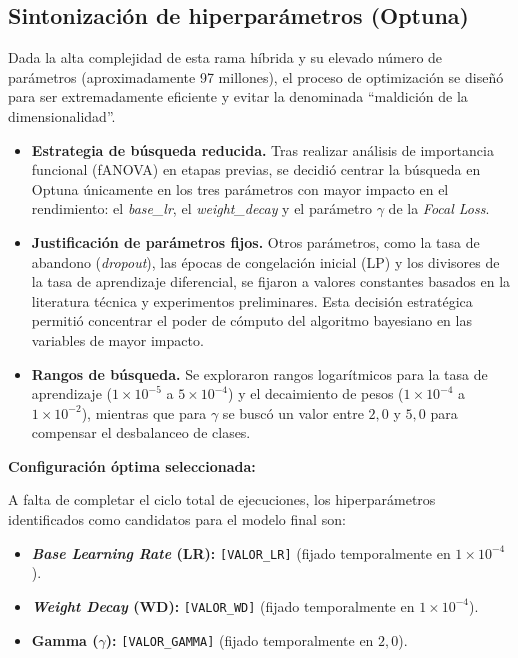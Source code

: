 \subsection{Sintonización de hiperparámetros (Optuna)}

Dada la alta complejidad de esta rama híbrida y su elevado número de parámetros (aproximadamente 97 millones), el proceso de optimización se diseñó para ser extremadamente eficiente y evitar la denominada ``maldición de la dimensionalidad''.

\begin{itemize}
	\item \textbf{Estrategia de búsqueda reducida.} Tras realizar análisis de importancia funcional (fANOVA) en etapas previas, se decidió centrar la búsqueda en Optuna únicamente en los tres parámetros con mayor impacto en el rendimiento: el \textit{base\_lr}, el \textit{weight\_decay} y el parámetro $\gamma$ de la \textit{Focal Loss}.
	
	\item \textbf{Justificación de parámetros fijos.} Otros parámetros, como la tasa de abandono (\textit{dropout}), las épocas de congelación inicial (LP) y los divisores de la tasa de aprendizaje diferencial, se fijaron a valores constantes basados en la literatura técnica y experimentos preliminares. Esta decisión estratégica permitió concentrar el poder de cómputo del algoritmo bayesiano en las variables de mayor impacto.
	
	\item \textbf{Rangos de búsqueda.} Se exploraron rangos logarítmicos para la tasa de aprendizaje ($1 \times 10^{-5}$ a $5 \times 10^{-4}$) y el decaimiento de pesos ($1 \times 10^{-4}$ a $1 \times 10^{-2}$), mientras que para $\gamma$ se buscó un valor entre $2,0$ y $5,0$ para compensar el desbalanceo de clases.
\end{itemize}

\textbf{Configuración óptima seleccionada:}

A falta de completar el ciclo total de ejecuciones, los hiperparámetros identificados como candidatos para el modelo final son:

\begin{itemize}
	\item \textbf{\textit{Base Learning Rate} (LR):} \texttt{[VALOR\_LR]} (fijado temporalmente en $1 \times 10^{-4}$).
	\item \textbf{\textit{Weight Decay} (WD):} \texttt{[VALOR\_WD]} (fijado temporalmente en $1 \times 10^{-4}$).
	\item \textbf{Gamma ($\gamma$):} \texttt{[VALOR\_GAMMA]} (fijado temporalmente en $2,0$).
\end{itemize}

